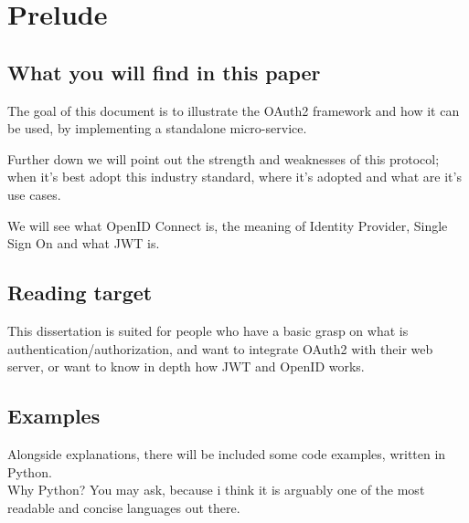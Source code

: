 \section{Prelude}
\subsection{What you will find in this paper}
The goal of this document is to illustrate the OAuth2 framework and
how it can be used, by implementing a standalone micro-service.

Further down we will point out the strength and weaknesses of this protocol; when
it's best adopt this industry standard, where it's adopted and what are it's use
cases.

We will see what OpenID Connect is, the meaning of Identity Provider, Single
Sign On and what JWT is.

\subsection{Reading target}
This dissertation is suited for people who have a basic grasp on what is
authentication/authorization, and want to integrate OAuth2 with their web
server, or want to know in depth how JWT and OpenID works.

\subsection{Examples}
Alongside explanations, there will be included some code examples, written in
Python.
\\
Why Python? You may ask, because i think it is arguably one of the most readable
and concise languages out there.
